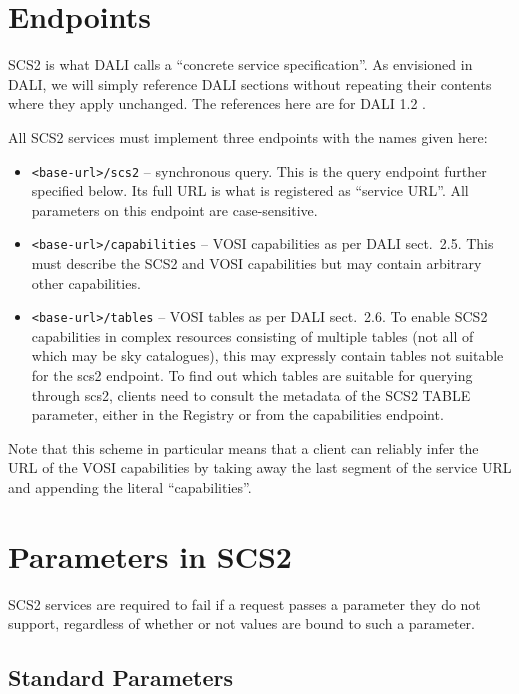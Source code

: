 \documentclass[11pt,a4paper]{ivoa}
\begin{document}
\section{Endpoints}
\label{sect:endpoints}

SCS2 is what DALI calls a ``concrete service
specification''.  As envisioned in DALI, we will simply reference DALI
sections without repeating their contents where
they apply unchanged.  The references here are for DALI 1.2
\citep{2017ivoa.spec.0517D}.

All SCS2 services must implement three endpoints with the names given
here:

\begin{itemize}
\item \verb|<base-url>/scs2| -- synchronous query.  This is the query
endpoint further specified below.  Its full URL is what is registered as
``service URL''.  All parameters on this endpoint are case-sensitive.

\item \verb|<base-url>/capabilities| -- VOSI capabilities as per DALI
sect.~2.5.  This must describe the SCS2 and VOSI capabilities but may
contain arbitrary other capabilities.

\item \verb|<base-url>/tables| -- VOSI tables as per DALI sect.~2.6.
To enable SCS2 capabilities in complex resources consisting of multiple
tables (not all of which may be sky catalogues), this may expressly
contain tables not suitable for the scs2 endpoint.  To find out which
tables are suitable for querying through scs2, clients need to consult
the metadata of the SCS2 TABLE parameter, either in the Registry or from
the capabilities endpoint.
\end{itemize}

Note that this scheme in particular means that a client can reliably
infer the URL of the VOSI capabilities by taking away the last segment
of the service URL and appending the literal ``capabilities''.

\section{Parameters in SCS2}

SCS2 services are required to fail if a request passes a parameter they do
not support, regardless of whether or not values are bound to such a
parameter.

\subsection{Standard Parameters}
\end{document}

